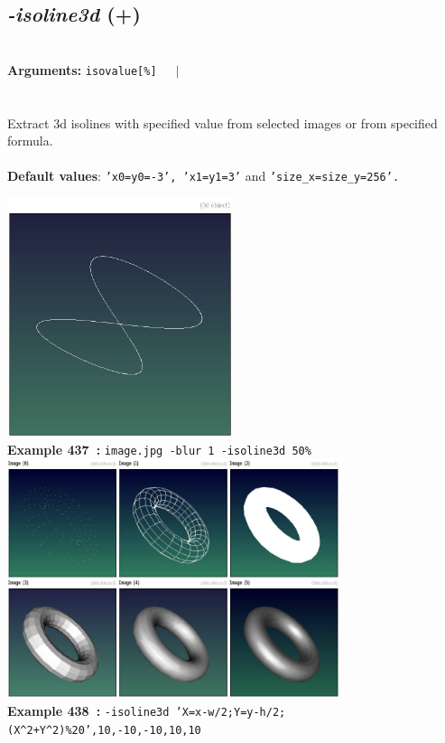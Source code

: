 \documentclass[a4paper,11pt,twoside]{book}
\begin{document}
\subsection{\emph{-isoline3d} (+)}\vspace*{-0.5em}
~\\\textbf{Arguments: } 
{\small \texttt{isovalue[\%]}}~~~$|$\\
\\~\\
Extract 3d isolines with specified value from selected images or from specified formula.
~\\~\\\textbf{Default values}: {\small \texttt{'x0=y0=-3', 'x1=y1=3'} and \texttt{'size\_x=size\_y=256'.}}
\begin{center}\includegraphics[keepaspectratio=true,height=7cm,width=\textwidth]{img/gmic_def437.jpg}\\
{\footnotesize \textbf{Example 437~:} \texttt{image.jpg -blur 1 -isoline3d 50\%}}
\\\includegraphics[keepaspectratio=true,height=7cm,width=\textwidth]{img/gmic_def438.jpg}\\
{\footnotesize \textbf{Example 438~:} \texttt{-isoline3d 'X=x-w/2;Y=y-h/2;(X\textasciicircum 2+Y\textasciicircum 2)\%20',10,-10,-10,10,10}}
\end{center}
\end{document}
